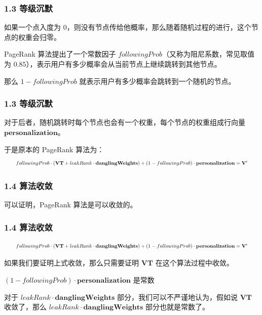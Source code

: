 \documentclass{beamer}
\begin{document}
\begin{frame}
	\frametitle{1.3 等级沉默}
	如果一个点入度为 \(0\)，则没有节点传给他概率，那么随着随机过程的进行，这个节点的权重会归零。
	
	\pause
	
	PageRank 算法提出了一个常数因子 \(followingProb\)（又称为阻尼系数，常见取值为 \(0.85\)），表示用户有多少概率会从当前节点上继续跳转到其他节点。
	
	\pause
	
	那么 \(1 - followingProb\) 就表示用户有多少概率会跳转到一个随机的节点。
\end{frame}

\begin{frame}
	\frametitle{1.3 等级沉默}
	对于后者，随机跳转时每个节点也会有一个权重，每个节点的权重组成行向量 \(\mathbf{personalization}\)。
	
	\pause
	
	于是原本的 PageRank 算法为：
	\begin{equation*}
		\resizebox{0.95\linewidth}{!}{$
			followingProb \cdot ( \mathbf{V}\mathbf{T} + leakRank \cdot \mathbf{danglingWeights}) + (1 - followingProb) \cdot \mathbf{personalization} = \mathbf{V}'
		$}
	\end{equation*}
\end{frame}

\begin{frame}
	\frametitle{1.4 算法收敛}
	可以证明，PageRank 算法是可以收敛的。
\end{frame}

\begin{frame}
	\frametitle{1.4 算法收敛}

	\begin{equation*}
		\resizebox{0.95\linewidth}{!}{$
			followingProb \cdot ( \mathbf{V}\mathbf{T} + leakRank \cdot \mathbf{danglingWeights}) + (1 - followingProb) \cdot \mathbf{personalization} = \mathbf{V}'
		$}
	\end{equation*}

	\pause
	
	如果我们要证明上式收敛，那么只需要证明 \(\mathbf{V}\mathbf{T}\) 在这个算法过程中收敛。 
	
	\pause

	\((1 - followingProb) \cdot \mathbf{personalization}\) 是常数
	
	\pause

	对于 \(leakRank \cdot \mathbf{danglingWeights}\) 部分，我们可以不严谨地认为，假如说 \(\mathbf{V}\mathbf{T}\) 收敛了，那么 \(leakRank \cdot \mathbf{danglingWeights}\) 部分也就是常数了。 
\end{frame}
\end{document}

